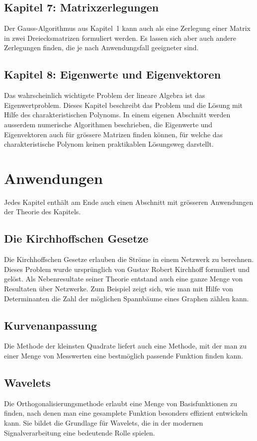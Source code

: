 \subsection*{Kapitel 7: Matrixzerlegungen}
Der Gauss-Algorithmus aus Kapitel~1 kann auch als eine
Zerlegung einer Matrix in zwei Dreiecksmatrizen formuliert werden.
Es lassen sich aber auch andere Zerlegungen finden, die je
nach Anwendungsfall geeigneter sind.

\subsection*{Kapitel 8: Eigenwerte und Eigenvektoren}
Das wahrscheinlich wichtigste Problem der lineare Algebra
ist das Eigenwertproblem.
Dieses Kapitel beschreibt das Problem und die Lösung mit Hilfe
des charakteristischen Polynoms.
In einem eigenen Abschnitt werden ausserdem numerische Algorithmen
beschrieben, die Eigenwerte und Eigenvektoren auch für grössere
Matrizen finden können, für welche das charakteristische 
Polynom keinen praktikablen Lösungsweg darstellt.

\section*{Anwendungen}
Jedes Kapitel enthält am Ende auch einen Abschnitt mit grösseren
Anwendungen der Theorie des Kapitels.

\subsection*{Die Kirchhoffschen Gesetze}
Die Kirchhoffschen Gesetze erlauben die Ströme in einem Netzwerk
zu berechnen.
Dieses Problem wurde ursprünglich von Gustav Robert Kirchhoff
formuliert und gelöst.
Als Nebenresultate seiner Theorie
entstand auch eine ganze Menge von Resultaten über Netzwerke.
Zum Beispiel zeigt sich, wie man mit Hilfe von Determinanten
die Zahl der möglichen Spannbäume eines Graphen zählen kann.

\subsection*{Kurvenanpassung}
Die Methode der kleinsten Quadrate liefert auch eine Methode,
mit der man zu einer Menge von Messwerten eine bestmöglich passende
Funktion finden kann.

\subsection*{Wavelets}
Die Orthogonalisierungsmethode erlaubt eine Menge von
Basisfunktionen zu finden, nach denen man eine gesamplete Funktion
besonders effizient entwickeln kann.
Sie bildet die Grundlage für Wavelets, die in der modernen Signalverarbeitung
eine bedeutende Rolle spielen.

